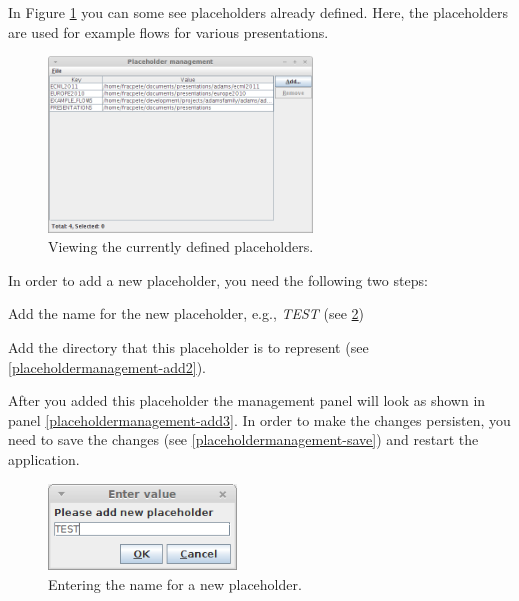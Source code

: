 In Figure \ref{placeholdermanagement-main} you can some see placeholders already
defined. Here, the placeholders are used for example flows for various 
presentations.

\begin{figure}[htb]
  \centering
  \includegraphics[width=7.0cm]{images/placeholdermanagement-main.png}
  \caption{Viewing the currently defined placeholders.}
  \label{placeholdermanagement-main}
\end{figure}

\clearpage
{}
In order to add a new placeholder, you need the following two steps:
\begin{tight_enumerate}
	\item Add the name for the new placeholder, e.g., \textit{TEST} 
	(see \ref{placeholdermanagement-add1})
	\item Add the directory that this placeholder is to represent 
	(see \ref{placeholdermanagement-add2}).
\end{tight_enumerate}
After you added this placeholder the management panel will look as shown in panel \ref{placeholdermanagement-add3}.
In order to make the changes persisten, you need to save the changes (see 
\ref{placeholdermanagement-save}) and restart the application.

\begin{figure}[htb]
  \centering
  \includegraphics[width=5.0cm]{images/placeholdermanagement-add1.png}
  \caption{Entering the name for a new placeholder.}
  \label{placeholdermanagement-add1}
\end{figure}

